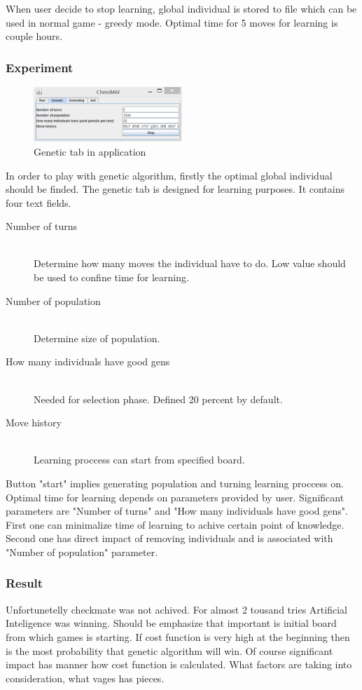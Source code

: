 \documentclass[pdftex]{article}
\begin{document}
When user decide to stop learning, global individual is stored to file which can be used in normal game - greedy mode.
Optimal time for 5 moves for learning is couple hours.

\subsubsection{Experiment}
\begin{figure}[!htb]
	\centering
	\includegraphics[width=0.5\textwidth]{genetic/genetic_gui.png} 
	\caption{Genetic tab in application}
	\label{fig:genetic_gui}
\end{figure}
In order to play with genetic algorithm, firstly the optimal global individual should be finded. 
The genetic tab is designed for learning purposes. It contains four text fields.

\begin{description}
  \item[Number of turns] \hfill \\
  Determine how many moves the individual have to do. Low value should be used to confine time for learning.
  \item[Number of population] \hfill \\
  Determine size of population.
  \item[How many individuals have good gens] \hfill \\
  Needed for selection phase. Defined 20 percent by default.
  \item[Move history] \hfill \\
  Learning proccess can start from specified board.
\end{description}

Button "start" implies generating population and turning learning proccess on.
Optimal time for learning depends on parameters provided by user. Significant parameters are "Number of turns" and "How many individuals have good gens". First one can minimalize time of learning to achive certain point of knowledge. Second one has direct impact of removing individuals and is associated with "Number of population" parameter. 

\subsubsection{Result}
Unfortunetelly checkmate was not achived. 
For almost 2 tousand tries Artificial Inteligence was winning. Should be emphasize that important is initial board from which games is starting. If cost function is very high at the beginning then is the most probability that genetic algorithm will win. Of course significant impact has manner how cost function is calculated. What factors are taking into consideration, what vages has pieces. 
\end{document}
